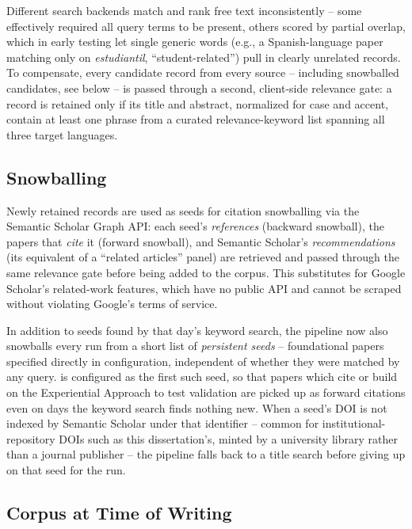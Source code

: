 \documentclass[11pt]{article}
\begin{document}
Different search backends match and rank free text inconsistently -- some effectively required all query terms to be present, others scored by partial overlap, which in early testing let single generic words (e.g., a Spanish-language paper matching only on \textit{estudiantil}, ``student-related'') pull in clearly unrelated records. To compensate, every candidate record from every source -- including snowballed candidates, see below -- is passed through a second, client-side relevance gate: a record is retained only if its title and abstract, normalized for case and accent, contain at least one phrase from a curated relevance-keyword list spanning all three target languages.

\subsection{Snowballing}
\label{sec:snowball_persistent}

Newly retained records are used as seeds for citation snowballing via the Semantic Scholar Graph API: each seed's \emph{references} (backward snowball), the papers that \emph{cite} it (forward snowball), and Semantic Scholar's \emph{recommendations} (its equivalent of a ``related articles'' panel) are retrieved and passed through the same relevance gate before being added to the corpus. This substitutes for Google Scholar's related-work features, which have no public API and cannot be scraped without violating Google's terms of service.

In addition to seeds found by that day's keyword search, the pipeline now also snowballs every run from a short list of \emph{persistent seeds} -- foundational papers specified directly in configuration, independent of whether they were matched by any query. \citet{araneda2023dissertation} is configured as the first such seed, so that papers which cite or build on the Experiential Approach to test validation are picked up as forward citations even on days the keyword search finds nothing new. When a seed's DOI is not indexed by Semantic Scholar under that identifier -- common for institutional-repository DOIs such as this dissertation's, minted by a university library rather than a journal publisher -- the pipeline falls back to a title search before giving up on that seed for the run.

\subsection{Corpus at Time of Writing}
\end{document}
